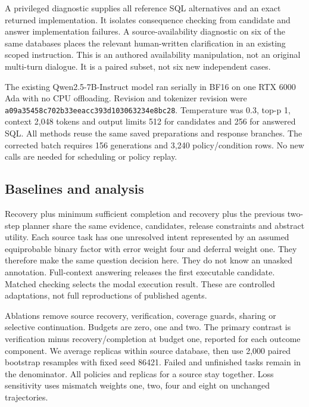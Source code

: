 \documentclass[11pt]{article}
\begin{document}
A privileged diagnostic supplies all reference SQL alternatives and an exact returned implementation. It isolates consequence checking from candidate and answer implementation failures. A source-availability diagnostic on six of the same databases places the relevant human-written clarification in an existing scoped instruction. This is an authored availability manipulation, not an original multi-turn dialogue. It is a paired subset, not six new independent cases.

The existing Qwen2.5-7B-Instruct model ran serially in BF16 on one RTX 6000 Ada with no CPU offloading. Revision and tokenizer revision were \texttt{a09a35458c702b33eeacc393d103063234e8bc28}. Temperature was 0.3, top-p 1, context 2,048 tokens and output limits 512 for candidates and 256 for answered SQL. All methods reuse the same saved preparations and response branches. The corrected batch requires 156 generations and 3,240 policy/condition rows. No new calls are needed for scheduling or policy replay.

\subsection{Baselines and analysis}
Recovery plus minimum sufficient completion and recovery plus the previous two-step planner share the same evidence, candidates, release constraints and abstract utility. Each source task has one unresolved intent represented by an assumed equiprobable binary factor with error weight four and deferral weight one. They therefore make the same question decision here. They do not know an unasked annotation. Full-context answering releases the first executable candidate. Matched checking selects the modal execution result. These are controlled adaptations, not full reproductions of published agents.

Ablations remove source recovery, verification, coverage guards, sharing or selective continuation. Budgets are zero, one and two. The primary contrast is verification minus recovery/completion at budget one, reported for each outcome component. We average replicas within source database, then use 2,000 paired bootstrap resamples with fixed seed 86421. Failed and unfinished tasks remain in the denominator. All policies and replicas for a source stay together. Loss sensitivity uses mismatch weights one, two, four and eight on unchanged trajectories.
\end{document}
